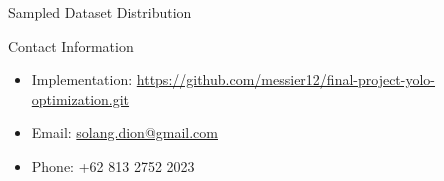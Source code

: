 \documentclass[final,hyperref={pdfpagelabels=false}]{beamer}
\begin{document}
\begin{frame}[t]
\begin{columns}[t]
\begin{column}{.465\textwidth}
\begin{block}{Sampled Dataset Distribution}
\end{block}


% 
% 
% 
% 
% 

\begin{block}{Contact Information}

\begin{itemize}
\item Implementation: \href{https://github.com/messier12/final-project-yolo-optimization.git}{https://github.com/messier12/final-project-yolo-optimization.git}
\item Email: \href{mailto:solang.dion@gmail.com}{solang.dion@gmail.com}
\item Phone: +62 813 2752 2023
\end{itemize}

\end{block}


\end{column} %

\begin{column}{.015\textwidth}\end{column} %

\end{columns} %

\end{frame} %
\end{document}
